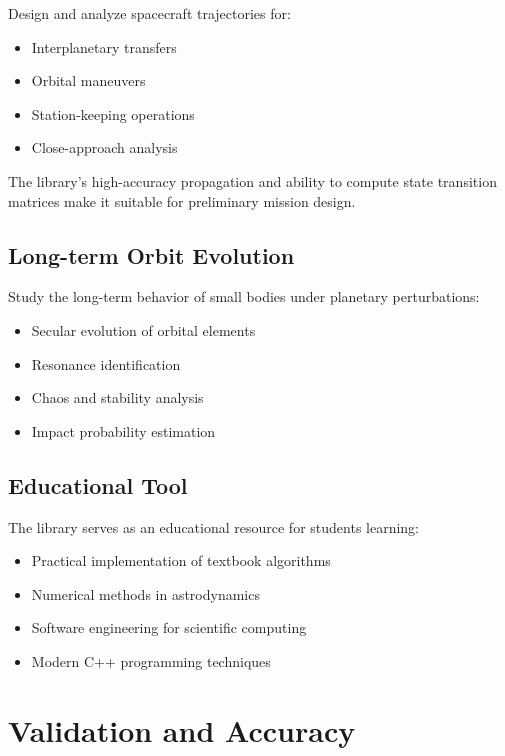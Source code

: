 Design and analyze spacecraft trajectories for:

\begin{itemize}
    \item Interplanetary transfers
    \item Orbital maneuvers
    \item Station-keeping operations
    \item Close-approach analysis
\end{itemize}

The library's high-accuracy propagation and ability to compute state transition matrices make it suitable for preliminary mission design.

\subsection{Long-term Orbit Evolution}

Study the long-term behavior of small bodies under planetary perturbations:

\begin{itemize}
    \item Secular evolution of orbital elements
    \item Resonance identification
    \item Chaos and stability analysis
    \item Impact probability estimation
\end{itemize}

\subsection{Educational Tool}

The library serves as an educational resource for students learning:

\begin{itemize}
    \item Practical implementation of textbook algorithms
    \item Numerical methods in astrodynamics
    \item Software engineering for scientific computing
    \item Modern C++ programming techniques
\end{itemize}

\section{Validation and Accuracy}

